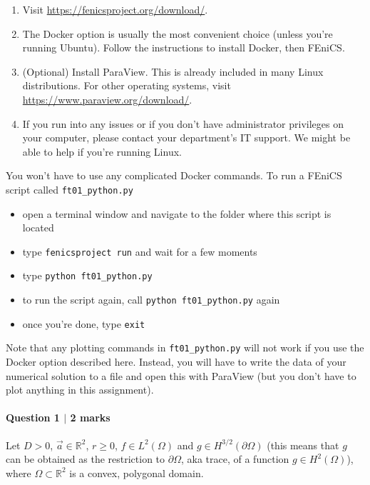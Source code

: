\begin{enumerate}[1.]
\item Visit \url{https://fenicsproject.org/download/}.
\item The \textsf{Docker} option is usually the most convenient choice (unless you're running \textsf{Ubuntu}). Follow the instructions to install \textsf{Docker}, then \textsf{FEniCS}.
\item (Optional) Install \textsf{ParaView}. This is already included in many \textsf{Linux} distributions. For other operating systems, visit \url{https://www.paraview.org/download/}.
\item If you run into any issues or if you don't have administrator privileges on your computer, please contact your department's IT support. We might be able to help if you're running \textsf{Linux}.
\end{enumerate}

You won't have to use any complicated \textsf{Docker} commands. To run a \textsf{FEniCS} script called \verb#ft01_python.py#
\begin{itemize}
\item open a terminal window and navigate to the folder where this script is located
\item type \verb#fenicsproject run# and wait for a few moments
\item type \verb#python ft01_python.py#
\item to run the script again, call \verb#python ft01_python.py# again
\item once you're done, type \verb#exit#
\end{itemize}
Note that any plotting commands in \verb#ft01_python.py# will not work if you use the \textsf{Docker} option described here. Instead, you will have to write the data of your numerical solution to a file and open this with \textsf{ParaView} (but you don't have to plot anything in this assignment).

\paragraph*{Question 1 $\vert$ 2 marks}%

Let $D > 0$, $\vec{a} \in \mathbb{R}^2$, $r \geq 0$, $f\in L^2(\Omega)$ and $g\in H^{3/2}(\partial\Omega)$ (this means that $g$ can be obtained as the restriction to $\partial \Omega$, aka trace, of a function $g\in H^2(\Omega)$), where $\Omega \subset \mathbb{R}^2$ is a convex, polygonal domain.

